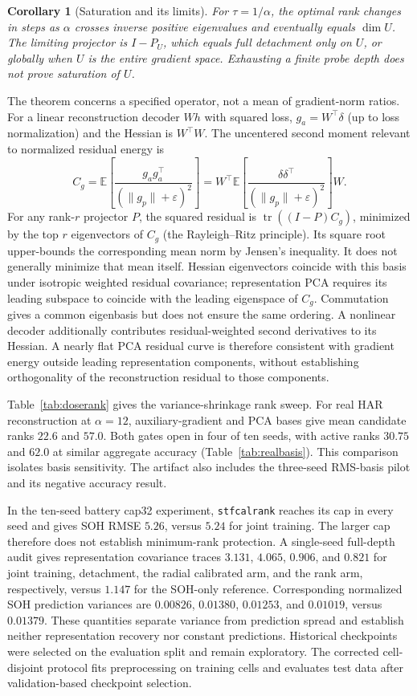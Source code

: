\documentclass{article}
\newtheorem{corollary}{Corollary}
\begin{document}
\begin{corollary}[Saturation and its limits]\label{cor:saturated}
For $\tau=1/\alpha$, the optimal rank changes in steps as $\alpha$ crosses inverse positive eigenvalues and eventually equals $\dim U$. The limiting projector is $I-P_U$, which equals full detachment only on $U$, or globally when $U$ is the entire gradient space. Exhausting a finite probe depth does not prove saturation of $U$.
\end{corollary}

The theorem concerns a specified operator, not a mean of gradient-norm ratios. For a linear reconstruction decoder $Wh$ with squared loss, $g_a=W^\top\delta$ (up to loss normalization) and the Hessian is $W^\top W$. The uncentered second moment relevant to normalized residual energy is
\[
C_g=\mathbb E\!\left[\frac{g_ag_a^\top}{(\|g_p\|+\varepsilon)^2}\right]
=W^\top\mathbb E\!\left[\frac{\delta\delta^\top}{(\|g_p\|+\varepsilon)^2}\right]W.
\]
For any rank-$r$ projector $P$, the squared residual is $\operatorname{tr}((I-P)C_g)$, minimized by the top $r$ eigenvectors of $C_g$ (the Rayleigh--Ritz principle). Its square root upper-bounds the corresponding mean norm by Jensen's inequality. It does not generally minimize that mean itself. Hessian eigenvectors coincide with this basis under isotropic weighted residual covariance; representation PCA requires its leading subspace to coincide with the leading eigenspace of $C_g$. Commutation gives a common eigenbasis but does not ensure the same ordering. A nonlinear decoder additionally contributes residual-weighted second derivatives to its Hessian. A nearly flat PCA residual curve is therefore consistent with gradient energy outside leading representation components, without establishing orthogonality of the reconstruction residual to those components.

Table~\ref{tab:doserank} gives the variance-shrinkage rank sweep. For real HAR reconstruction at $\alpha=12$, auxiliary-gradient and PCA bases give mean candidate ranks $22.6$ and $57.0$. Both gates open in four of ten seeds, with active ranks $30.75$ and $62.0$ at similar aggregate accuracy (Table~\ref{tab:realbasis}). This comparison isolates basis sensitivity. The artifact also includes the three-seed RMS-basis pilot and its negative accuracy result.

In the ten-seed battery cap32 experiment, \texttt{stfcalrank} reaches its cap in every seed and gives SOH RMSE $5.26$, versus $5.24$ for joint training. The larger cap therefore does not establish minimum-rank protection. A single-seed full-depth audit gives representation covariance traces $3.131$, $4.065$, $0.906$, and $0.821$ for joint training, detachment, the radial calibrated arm, and the rank arm, respectively, versus $1.147$ for the SOH-only reference. Corresponding normalized SOH prediction variances are $0.00826$, $0.01380$, $0.01253$, and $0.01019$, versus $0.01379$. These quantities separate variance from prediction spread and establish neither representation recovery nor constant predictions. Historical checkpoints were selected on the evaluation split and remain exploratory. The corrected cell-disjoint protocol fits preprocessing on training cells and evaluates test data after validation-based checkpoint selection.
\end{document}
